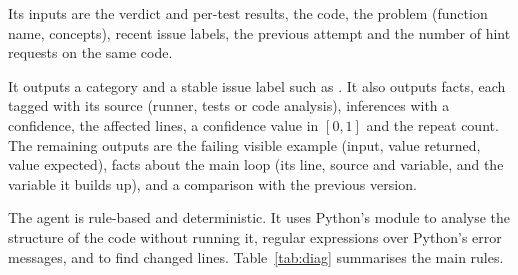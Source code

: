 Its inputs are the verdict and per-test results, the code, the problem (function name, concepts), recent issue labels, the previous attempt and the number of hint requests on the same code.

It outputs a category and a stable issue label such as . It also outputs facts, each tagged with its source (runner, tests or code analysis), inferences with a confidence, the affected lines, a confidence value in $[0,1]$ and the repeat count. The remaining outputs are the failing visible example (input, value returned, value expected), facts about the main loop (its line, source and variable, and the variable it builds up), and a comparison with the previous version.

The agent is rule-based and deterministic. It uses Python's  module to analyse the structure of the code without running it, regular expressions over Python's error messages, and  to find changed lines. Table~\ref{tab:diag} summarises the main rules.

